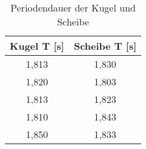 \begin{table}[h]
	\begin{center}
		\begin{tabular}{cc}
			Kugel T [s]& Scheibe T [s]\\ \hline
			1,813	&1,830\\
			1,820	&1,803\\
			1,813	&1,823\\
			1,810	&1,843\\
			1,850	&1,833
		\end{tabular}
		\caption{Periodendauer der Kugel und Scheibe}
		\label{tab:kugelscheibe}
	\end{center}
\end{table}